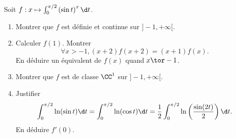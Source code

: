 \begin{enonce}
\begin{exercise}[ID={RMS 122-2 E1334 autres écoles PC},subtitle={},tags={}]
Soit $f:x\mapsto\int_0^{\pi/2} \left( \sin t \right)^x \d t$.
\begin{enumerate}
  \item Montrer que $f$ est définie et continue sur $]-1,+\infty[$.
  \item Calculer $f(1)$. Montrer
    \begin{equation*}
      \forall x>-1, (x+2)f(x+2)=(x+1)f(x).
    \end{equation*}
    En déduire un équivalent de $f(x)$ quand $x\tor -1$.
  \item Montrer que $f$ est de classe $\CC^1$ sur $]-1,+\infty[$.
  \item Justifier
    \begin{equation*}
      \int_0^{\pi/2}\ln(\sin t)\d t=\int_0^{\pi/2}\ln(\cos t)\d t=\frac12\int_0^{\pi/2}\ln\left( \frac{\sin(2t)}{2} \right)\d t.
    \end{equation*}
    En déduire $f'(0)$.
\end{enumerate}
\end{exercise}
\begin{solution}
\end{solution}
\end{enonce}
